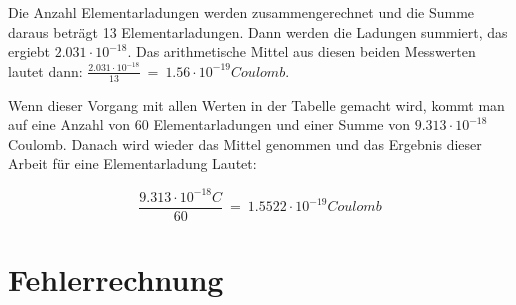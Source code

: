 \par
\noindent Die Anzahl Elementarladungen werden zusammengerechnet und die Summe daraus beträgt 13 Elementarladungen. Dann werden die Ladungen summiert, das ergiebt $2.031 \cdot 10^{-18}$. Das arithmetische Mittel aus diesen beiden Messwerten lautet dann: $\frac{2.031 \cdot 10^{-18}}{13} \ = \ 1.56 \cdot 10^{-19} Coulomb$. 

Wenn dieser Vorgang mit allen Werten in der Tabelle gemacht wird, kommt man auf eine Anzahl von 60 Elementarladungen und einer Summe von $9.313 \cdot 10^{-18}$ Coulomb. Danach wird wieder das Mittel genommen und das Ergebnis dieser Arbeit für eine Elementarladung Lautet:

\begin{equation}\label{eq:ergebnis}
	\frac{9.313 \cdot 10^{-18}C}{60} \ = \ 1.5522 \cdot 10^{-19} Coulomb
\end{equation}

\section{Fehlerrechnung}\label{sec:genauigkeitAuswertung}


